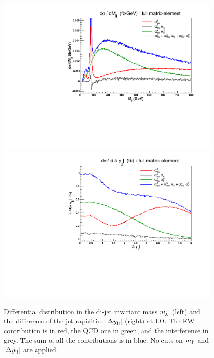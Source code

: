 \begin{figure}[hbt]
\centering
\includegraphics[scale=0.395]{figures/scanfigures/mjj_full.pdf}
\includegraphics[scale=0.395]{figures/scanfigures/dyjj_full.pdf}
\caption{Differential distribution in the di-jet invariant mass $m_{\text{j}\text{j}}$ (left) and the difference of the jet rapidities $|\Delta y_{\text{j}\text{j}}|$ (right) at LO.
The EW contribution is in red, the QCD one in green, and the interference in grey.
The sum of all the contributions is in blue.
No cuts on $m_{\text{j}\text{j}}$ and $|\Delta y_{\text{j}\text{j}}|$ are applied.
}
\label{fig:mjjdyjj_1d}
\end{figure}

